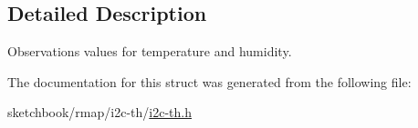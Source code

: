 \subsection{Detailed Description}
Observations values for temperature and humidity. 

The documentation for this struct was generated from the following file\+:\begin{DoxyCompactItemize}
\item 
sketchbook/rmap/i2c-\/th/\hyperlink{i2c-th_8h}{i2c-\/th.\+h}\end{DoxyCompactItemize}
